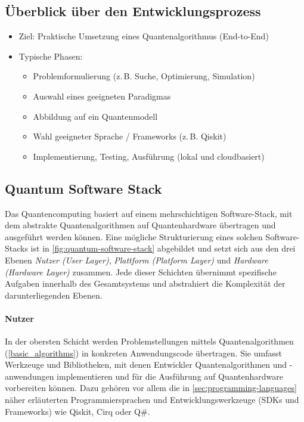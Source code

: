 \subsection{Überblick über den Entwicklungsprozess}
\begin{itemize}
    \item Ziel: Praktische Umsetzung eines Quantenalgorithmus (End-to-End)
    \item Typische Phasen:
    \begin{itemize}
        \item Problemformulierung (z.\,B. Suche, Optimierung, Simulation)
        \item Auswahl eines geeigneten Paradigmas
        \item Abbildung auf ein Quantenmodell
        \item Wahl geeigneter Sprache / Frameworks (z.\,B. Qiskit)
        \item Implementierung, Testing, Ausführung (lokal und cloudbasiert)
    \end{itemize}
\end{itemize}

\subsection{Quantum Software Stack}

Das Quantencomputing basiert auf einem mehrschichtigen Software-Stack, mit dem abstrakte Quantenalgorithmen auf Quantenhardware übertragen und ausgeführt werden können. Eine mögliche Strukturierung eines solchen Software-Stacks ist in \autoref{fig:quantum-software-stack} abgebildet und setzt sich aus den drei Ebenen \emph{Nutzer (User Layer)}, \emph{Plattform (Platform Layer)} und \emph{Hardware (Hardware Layer)} zusammen. Jede dieser Schichten übernimmt spezifische Aufgaben innerhalb des Gesamtsystems und abstrahiert die Komplexität der darunterliegenden Ebenen.
\\
\paragraph{Nutzer}  
In der obersten Schicht werden Problemstellungen mittels Quantenalgorithmen (\autoref{basic_algorithms}) in konkreten Anwendungscode übertragen. Sie umfasst Werkzeuge und Bibliotheken, mit denen Entwickler Quantenalgorithmen und -anwendungen implementieren und für die Ausführung auf Quantenhardware vorbereiten können. Dazu gehören vor allem die in \autoref{sec:programming-languages} näher erläuterten Programmiersprachen und Entwicklungswerkzeuge (SDKs und Frameworks) wie Qiskit, Cirq oder Q\#.
\\
